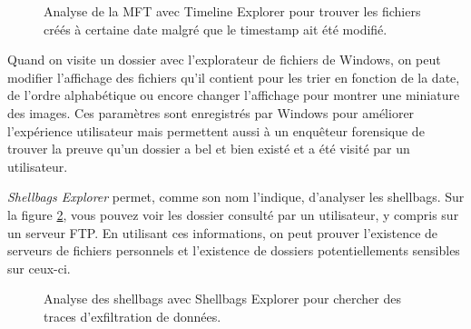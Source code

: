 \begin{figure}
    \centering
    \caption{Analyse de la MFT avec Timeline Explorer pour trouver les fichiers créés à certaine date malgré que le timestamp ait été modifié.}
    \label{fig:zimmerman-timeline-explorer}
\end{figure}

Quand on visite un dossier avec l'explorateur de fichiers de Windows, on peut modifier l'affichage des fichiers qu'il contient pour les trier en fonction de la date, de l'ordre alphabétique ou encore changer l'affichage pour montrer une miniature des images. Ces paramètres sont enregistrés par Windows pour améliorer l'expérience utilisateur mais permettent aussi à un enquêteur forensique de trouver la preuve qu'un dossier a bel et bien existé et a été visité par un utilisateur.

\textit{Shellbags Explorer} permet, comme son nom l'indique, d'analyser les shellbags. Sur la figure \ref{fig:zimmerman-shellbags-explorer}, vous pouvez voir les dossier consulté par un utilisateur, y compris sur un serveur FTP. En utilisant ces informations, on peut prouver l'existence de serveurs de fichiers personnels et l'existence de dossiers potentiellements sensibles sur ceux-ci.

\begin{figure}
    \centering
    \caption{Analyse des shellbags avec Shellbags Explorer pour chercher des traces d'exfiltration de données.}
    \label{fig:zimmerman-shellbags-explorer}
\end{figure}


